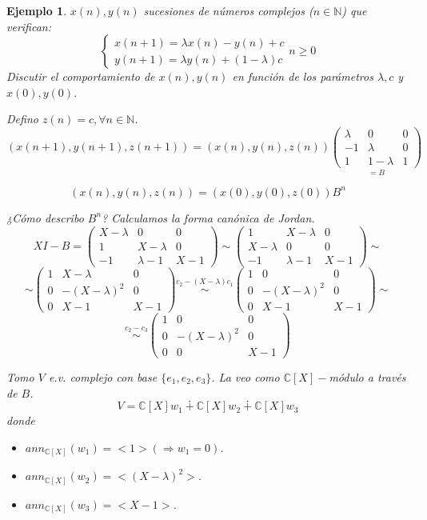 \documentclass[11pt,a4paper]{article}
\theoremstyle{break}
\newtheorem{example}[theorem]{Ejemplo}
\begin{document}

\begin{example}
\itshape
$x(n), y(n)$ sucesiones de números complejos ($n \in \mathbb{N}$) que verifican:
$$\begin{cases}
x(n+1) = \lambda x(n) - y(n) + c \\
y(n+1) = \lambda y(n) + (1-\lambda)c
\end{cases} n \geq 0$$
Discutir el comportamiento de $x(n), y(n)$ en función de los parámetros $\lambda, c$ y $x(0), y(0)$.

\vspace{0.25cm} \normalfont
Defino $z(n) = c, \forall n \in \mathbb{N}$.
$$(x(n+1), y(n+1), z(n+1)) = (x(n), y(n), z(n)) \underset{= B }{\begin{pmatrix}
\lambda & 0 & 0 \\
-1 & \lambda & 0 \\
1 & 1-\lambda & 1
\end{pmatrix}}$$

$$(x(n), y(n), z(n)) = (x(0), y(0), z(0)) B^{n}$$

¿Cómo describo $B^{n}$? Calculamos la forma canónica de Jordan.
$$XI - B = \begin{pmatrix}
X - \lambda & 0 & 0 \\
1 & X-\lambda & 0 \\
-1 & \lambda-1 & X-1
\end{pmatrix} \sim \begin{pmatrix}
1 & X-\lambda & 0 \\
X - \lambda & 0 & 0 \\
-1 & \lambda-1 & X-1
\end{pmatrix} \sim$$
$$\sim \begin{pmatrix}
1 & X-\lambda & 0 \\
0 & -(X-\lambda)^{2} & 0 \\
0 & X-1 & X-1
\end{pmatrix} \overset{c_{2} - (X-\lambda)c_{1}}{\sim} \begin{pmatrix}
1 & 0 & 0 \\
0 & -(X-\lambda)^{2} & 0 \\
0 & X-1 & X-1
\end{pmatrix} \sim$$
$$\overset{c_{2}-c_{3}}{\sim} \begin{pmatrix}
1 & 0 & 0 \\
0 & -(X-\lambda)^{2} & 0 \\
0 & 0 & X-1
\end{pmatrix}$$

Tomo $V$ e.v. complejo con base $\{e_{1}, e_{2}, e_{3}\}$. La veo como $\mathbb{C}[X]-$módulo a través de $B$.
$$V = \mathbb{C}[X]w_{1} \dotplus \mathbb{C}[X]w_{2} \dotplus \mathbb{C}[X]w_{3}$$
donde
\begin{itemize}
\item $ann_{\mathbb{C}[X]}(w_{1}) = <1> (\Rightarrow w_{1} = 0)$.
\item $ann_{\mathbb{C}[X]}(w_{2}) = <(X-\lambda)^{2}>$.
\item $ann_{\mathbb{C}[X]}(w_{3}) = <X-1>$.
\end{itemize}


\end{example}
\end{document}
